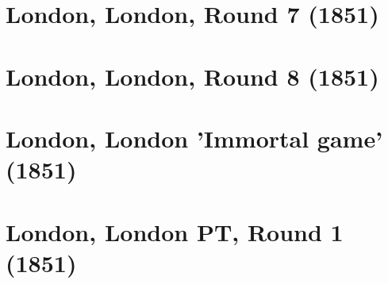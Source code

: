 \documentclass[11pt]{article}
\newcommand*\cleartoleftpage{%
   \clearpage
   \ifodd\value{page}\hbox{}\newpage\fi
}
\begin{document}
\cleartoleftpage



\cleartoleftpage



\cleartoleftpage



\cleartoleftpage



\cleartoleftpage



\cleartoleftpage

\section{London, London, Round 7 (1851)}


\cleartoleftpage



\cleartoleftpage



\cleartoleftpage



\cleartoleftpage



\cleartoleftpage

\section{London, London, Round 8 (1851)}


\cleartoleftpage



\cleartoleftpage

\section{London, London 'Immortal game' (1851)}


\cleartoleftpage

\section{London, London PT, Round 1 (1851)}


\cleartoleftpage


\end{document}
